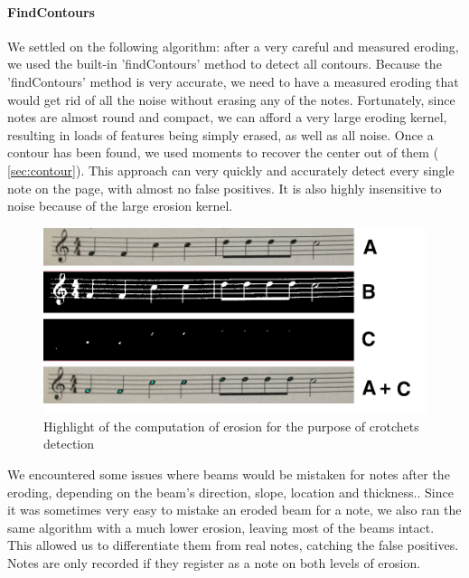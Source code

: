 \paragraph{FindContours}

We settled on the following algorithm: after a very careful and measured eroding, we used the built-in 'findContours' method to detect all contours. Because the 'findContours' method is very accurate, we need to have a measured eroding that would get rid of all the noise without erasing any of the notes. Fortunately, since notes are almost round and compact, we can afford a very large
eroding kernel, resulting in loads of features being simply erased, as well as all noise.
Once a contour has been found, we used moments to recover the center out of them ( \autoref{sec:contour}). This approach can very quickly and accurately detect every single note on the page, with almost no false positives. It is also highly insensitive to noise because of the large erosion kernel.
\begin{figure}[h!]
    \centering
    \includegraphics[width=1\textwidth]{./assets/highlight.png}
    \caption{Highlight of the computation of erosion for the purpose of crotchets detection}
    \label{image:highlight}
\end{figure}

We encountered some issues where beams would be mistaken for notes after the eroding, depending on the beam’s direction, slope, location and thickness.. Since it was sometimes very easy to mistake an eroded beam for a note, we also ran the same algorithm with a much lower erosion, leaving most of the beams intact. This allowed us to differentiate them from real notes,
catching the false positives. Notes are only recorded if they register as a note on both levels of erosion.


